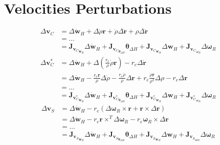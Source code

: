 \section{Velocities Perturbations}
\begin{equation}
    \begin{split}
        \Delta \mathbf{v}_{C} &= \Delta \dot{\mathbf{w}}_H + \Delta \dot{\rho} \mathbf{r} + \dot{\rho} \Delta \dot{\mathbf{r}} + \rho \Delta\dot{\mathbf{r}} \\
        &= \dots \\
        &= \mathbf{J}_{{\mathbf{v}_{C}}_{\dot{\mathbf{w}}_H}}\Delta \dot{\mathbf{w}}_H + \mathbf{J}_{{\mathbf{v}_{C}}_{\boldsymbol{\theta}_{\Delta H}}} \boldsymbol{\theta}_{\Delta H} + \mathbf{J}_{{\mathbf{v}_{C}}_{\mathbf{w}_H}}\Delta \mathbf{w}_H + \mathbf{J}_{{\mathbf{v}_{C}}_{\boldsymbol{\omega}_R}} \Delta \boldsymbol{\omega}_R
    \end{split}
\end{equation}
\begin{equation}
    \begin{split}
        \Delta \mathbf{v}_{C}^* &= \Delta \dot{\mathbf{w}}_H + \Delta \left(\frac{r_e}{\rho}\dot{\rho}\mathbf{r}\right) - r_e\Delta\dot{\mathbf{r}} \\
        &= \Delta \dot{\mathbf{w}}_H - \frac{r_e \mathbf{r}}{\rho} \Delta\dot{\rho} - \frac{r_e \dot{\rho}}{\rho} \Delta\mathbf{r} + r_e \frac{\dot{\rho}\mathbf{r}}{\rho^2}\Delta\rho - r_e\Delta\mathbf{r} \\
        &= \dots \\
        &= \mathbf{J}_{{\mathbf{v}_{C}^*}_{\dot{\mathbf{w}}_H}}\Delta \dot{\mathbf{w}}_H + \mathbf{J}_{{\mathbf{v}_{C}^*}_{\boldsymbol{\theta}_{\Delta H}}} \boldsymbol{\theta}_{\Delta H} + \mathbf{J}_{{\mathbf{v}_{C}^*}_{\mathbf{w}_H}}\Delta \mathbf{w}_H + \mathbf{J}_{{\mathbf{v}_{C}^*}_{\boldsymbol{\omega}_R}} \Delta \boldsymbol{\omega}_R
    \end{split}
\end{equation}
\begin{equation}
    \begin{split}
        \Delta \mathbf{v}_{S} &= \Delta \dot{\mathbf{w}}_H - r_e\left(\Delta\boldsymbol{\omega}_R \times \mathbf{r} + \boldsymbol{r} \times \Delta\mathbf{r}\right) \\
        &= \Delta \dot{\mathbf{w}}_H - r_e \mathbf{r} \times^T \Delta \boldsymbol{\omega}_R - r_e \boldsymbol{\omega}_R \times \Delta\mathbf{r}\\
        &= \dots \\
        &= \mathbf{J}_{{\mathbf{v}_{S}}_{\dot{\mathbf{w}}_H}}\Delta \dot{\mathbf{w}}_H + \mathbf{J}_{{\mathbf{v}_{S}}_{\boldsymbol{\theta}_{\Delta H}}} \boldsymbol{\theta}_{\Delta H} + \mathbf{J}_{{\mathbf{v}_{S}}_{\mathbf{w}_H}}\Delta \mathbf{w}_H + \mathbf{J}_{{\mathbf{v}_{S}}_{\boldsymbol{\omega}_R}} \Delta \boldsymbol{\omega}_R
    \end{split}
\end{equation}
